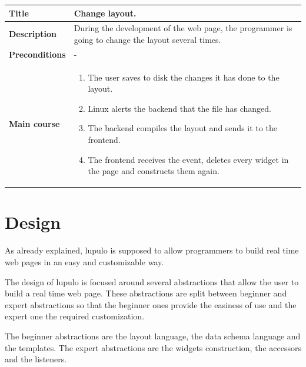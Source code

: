 \documentclass[12pt]{article}
\begin{document}
            \begin{tabularx}{\textwidth}{|l|X|}
                \hline
                \textbf{Title} & Change layout.\\
                \hline
                \textbf{Description} & During the development of the web page,
                the programmer is going to change the layout several times.\\
                \hline
                \textbf{Preconditions} & - \\
                \hline
                \textbf{Main course} &
                    \begin{enumerate}
                        \item The user saves to disk the changes it has done to
                              the layout.
                        \item Linux alerts the backend that the file has
                              changed.
                        \item The backend compiles the layout and sends it to
                              the frontend.
                        \item The frontend receives the event, deletes every
                              widget in the page and constructs them again.
                    \end{enumerate}\\
                \hline
            \end{tabularx}
            \setlength{\parindent}{1cm}


    \section{Design}
        As already explained, lupulo is supposed to allow programmers to build
        real time web pages in an easy and customizable way.

        The design of lupulo is focused around several abstractions that allow
        the user to build a real time web page. These abstractions are split
        between beginner and expert abstractions so that the beginner ones
        provide the easiness of use and the expert one the required
        customization.
        
        The beginner abstractions are the layout language, the data schema
        language and the templates. The expert abstractions are the widgets
        construction, the accessors and the listeners.
\end{document}
